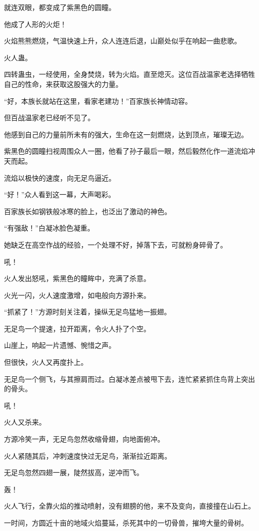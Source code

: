 \begin{this_body}
就连双眼，都变成了紫黑色的圆瞳。

他成了人形的火炬！

火焰熊熊燃烧，气温快速上升，众人连连后退，山巅处似乎在响起一曲悲歌。

火人蛊。

四转蛊虫，一经使用，全身焚烧，转为火焰。直至熄灭。这位百战温家老选择牺牲自己的性命，来获取这股强大的力量。

“好，本族长就站在这里，看家老建功！”百家族长神情动容。

但百战温家老已经听不见了。

他感到自己的力量前所未有的强大，生命在这一刻燃烧，达到顶点，璀璨无边。

紫黑色的圆瞳扫视周围众人一圈，他看了孙子最后一眼，然后毅然化作一道流焰冲天而起。

流焰以极快的速度，向无足鸟逼近。

“好！”众人看到这一幕，大声喝彩。

百家族长如钢铁般冰寒的脸上，也泛出了激动的神色。

“有强敌！”白凝冰脸色凝重。

她缺乏在高空作战的经验，一个处理不好，掉落下去，可就粉身碎骨了。

吼！

火人发出怒吼，紫黑色的瞳眸中，充满了杀意。

火光一闪，火人速度激增，如电般向方源扑来。

“抓紧了！”方源时刻关注着，操纵无足鸟猛地一振翅。

无足鸟一个提速，拉开距离，令火人扑了个空。

山崖上，响起一片遗憾、惋惜之声。

但很快，火人又再度扑上。

无足鸟一个侧飞，与其擦肩而过。白凝冰差点被甩下去，连忙紧紧抓住鸟背上突出的骨头。

吼！

火人又杀来。

方源冷笑一声，无足鸟忽然收缩骨翅，向地面俯冲。

火人紧随其后，冲刺速度快过无足鸟，渐渐拉近距离。

无足鸟忽然四翅一展，陡然拔高，逆冲而飞。

轰！

火人飞行，全靠火焰的推动喷射，没有翅膀的他，来不及变向，直接撞在山石上。

一时间，方圆近十亩的地域火焰蔓延，杀死其中的一切骨兽，摧垮大量的骨树。


\end{this_body}
